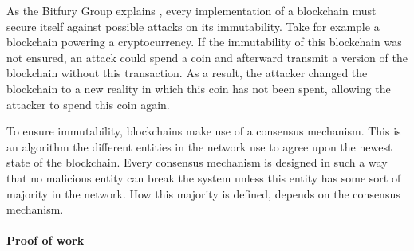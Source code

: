 \iffalse
- need to secure against attacks on the immutability of its blockchain. otherwise, eg. considering a cryptocurrency system, an attacker could spend a coin and afterwards nullify this transaction by transmitting their own version of the blockchain without the spent transaction

- what are consensus mechansisms
\fi

As the Bitfury Group explains \cite{bitfury-pos-vs-pow}, every implementation of a blockchain must secure itself against possible attacks on its immutability. Take for example a blockchain powering a cryptocurrency. If the immutability of this blockchain was not ensured, an attack could spend a coin and afterward transmit a version of the blockchain without this transaction. As a result, the attacker changed the blockchain to a new reality in which this coin has not been spent, allowing the attacker to spend this coin again.

To ensure immutability, blockchains make use of a consensus mechanism. This is an algorithm the different entities in the network use to agree upon the newest state of the blockchain. Every consensus mechanism is designed in such a way that no malicious entity can break the system unless this entity has some sort of majority in the network. How this majority is defined, depends on the consensus mechanism.

\iffalse
every consensus mechansism: 
- what is needed to suggest a new block
- how does this prevent 
- what are advantages and disadvantages
\fi

\paragraph{Proof of work}

\iffalse
- to suggest a new block, an entity needs to solve a random computational problem. This problem is designed as such that this entity, called the miner, has a chance of p%

- As the Bitfury Group correctly states \cite{bitfury-pos-vs-pow}: "[the] security of the network is supported by physically scarce resources: specialized hardware needed to run computations, and electricity spent to power the hardware." 
\fi

